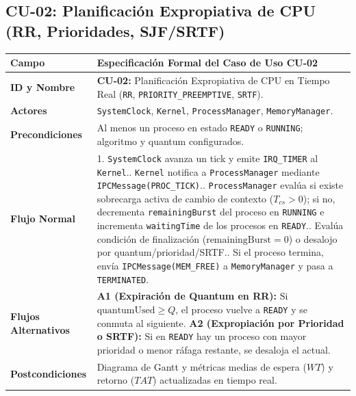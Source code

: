 \documentclass[10pt,twocolumn,letterpaper]{article}
\begin{document}
\subsection{CU-02: Planificaci\'on Expropiativa de CPU (RR, Prioridades, SJF/SRTF)}
\begin{table}[!htb]
\centering
\scriptsize
\renewcommand{\arraystretch}{1.12}
\begin{tabularx}{\columnwidth}{L{2.1cm} Y}
\toprule
\textbf{Campo} & \textbf{Especificaci\'on Formal del Caso de Uso CU-02} \\
\midrule
\textbf{ID y Nombre} & \textbf{CU-02:} Planificaci\'on Expropiativa de CPU en Tiempo Real (\texttt{RR}, \texttt{PRIORITY\_PREEMPTIVE}, \texttt{SRTF}). \\
\textbf{Actores} & \texttt{SystemClock}, \texttt{Kernel}, \texttt{ProcessManager}, \texttt{MemoryManager}. \\
\textbf{Precondiciones} & Al menos un proceso en estado \texttt{READY} o \texttt{RUNNING}; algoritmo y quantum configurados. \\
\textbf{Flujo Normal} & 1. \texttt{SystemClock} avanza un tick y emite \texttt{IRQ\_TIMER} al \texttt{Kernel}.. \texttt{Kernel} notifica a \texttt{ProcessManager} mediante \texttt{IPCMessage(PROC\_TICK)}.. \texttt{ProcessManager} eval\'ua si existe sobrecarga activa de cambio de contexto ($T_{cs} > 0$); si no, decrementa \texttt{remainingBurst} del proceso en \texttt{RUNNING} e incrementa \texttt{waitingTime} de los procesos en \texttt{READY}.. Eval\'ua condici\'on de finalizaci\'on ($\text{remainingBurst} = 0$) o desalojo por quantum/prioridad/SRTF.. Si el proceso termina, env\'ia \texttt{IPCMessage(MEM\_FREE)} a \texttt{MemoryManager} y pasa a \texttt{TERMINATED}. \\
\textbf{Flujos Alternativos} & \textbf{A1 (Expiraci\'on de Quantum en RR):} Si $\text{quantumUsed} \ge Q$, el proceso vuelve a \texttt{READY} y se conmuta al siguiente.\newline
\textbf{A2 (Expropiaci\'on por Prioridad o SRTF):} Si en \texttt{READY} hay un proceso con mayor prioridad o menor r\'afaga restante, se desaloja el actual. \\
\textbf{Postcondiciones} & Diagrama de Gantt y m\'etricas medias de espera ($WT$) y retorno ($TAT$) actualizadas en tiempo real. \\
\bottomrule
\end{tabularx}
\end{table}
\end{document}
